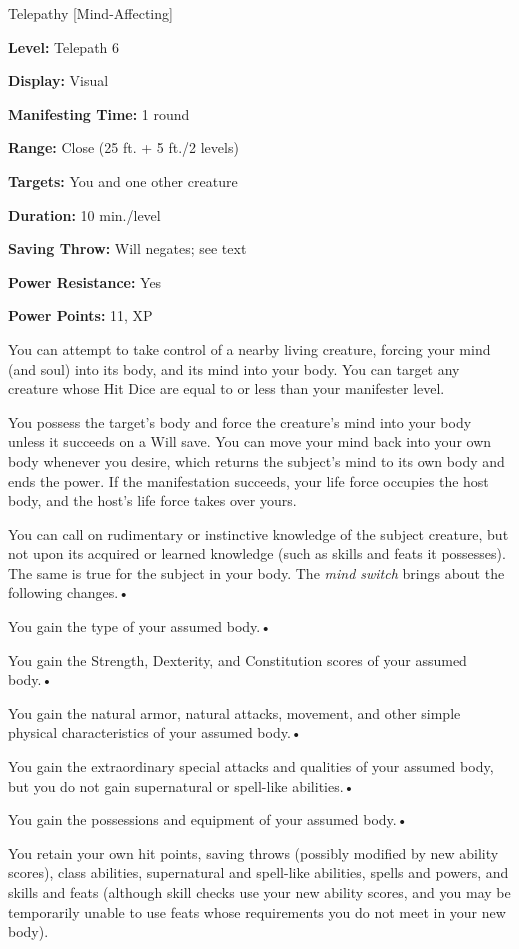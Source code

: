 \documentclass{article}
\begin{document}
Telepathy [Mind-Affecting]

\textbf{Level:} Telepath 6

\textbf{Display:} Visual

\textbf{Manifesting Time:} 1 round

\textbf{Range:} Close (25 ft. + 5 ft./2 levels)

\textbf{Targets:} You and one other creature

\textbf{Duration:} 10 min./level

\textbf{Saving Throw:} Will negates; see text

\textbf{Power Resistance:} Yes

\textbf{Power Points:} 11, XP

You can attempt to take control of a nearby living creature, forcing your mind 
(and soul) into its body, and its mind into your body. You can target any creature 
whose Hit Dice are equal to or less than your manifester level.

You possess the target's body and force the creature's mind into your body unless 
it succeeds on a Will save. You can move your mind back into your own body whenever 
you desire, which returns the subject's mind to its own body and ends the power. 
If the manifestation succeeds, your life force occupies the host body, and the 
host's life force takes over yours.

You can call on rudimentary or instinctive knowledge of the subject creature, but 
not upon its acquired or learned knowledge (such as skills and feats it possesses). 
The same is true for the subject in your body. The \textit{mind switch }brings 
about the following changes.• 

\parindent=3pt
You gain the type of your assumed body.• 

You gain the Strength, Dexterity, and Constitution scores of your assumed body.• 

\parindent=7pt
You gain the natural armor, natural attacks, movement, and other simple physical 
characteristics of your assumed body.• 

\parindent=3pt
You gain the extraordinary special attacks and qualities of your assumed body, 
but you do not gain supernatural or spell-like abilities.• 

You gain the possessions and equipment of your assumed body.• 

\parindent=7pt
You retain your own hit points, saving throws (possibly modified by new ability 
scores), class abilities, supernatural and spell-like abilities, spells and powers, 
and skills and feats (although skill checks use your new ability scores, and you 
may be temporarily unable to use feats whose requirements you do not meet in your 
new body).
\end{document}
